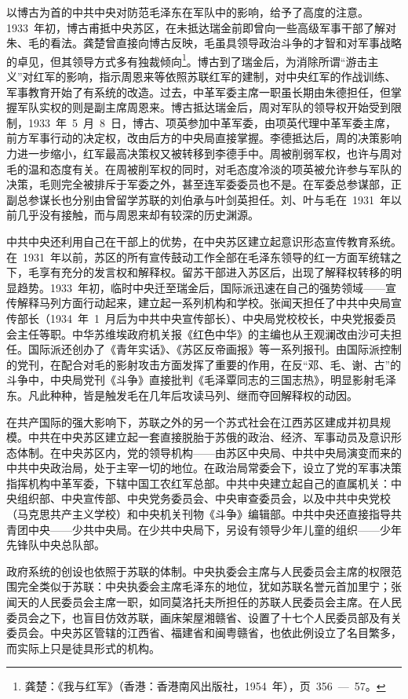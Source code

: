 以博古为首的中共中央对防范毛泽东在军队中的影响，给予了高度的注意。1933~年初，博古甫抵中央苏区，在未抵达瑞金前即曾向一些高级军事干部了解对朱、毛的看法。龚楚曾直接向博古反映，毛虽具领导政治斗争的才智和对军事战略的卓见，但其领导方式多有独裁倾向\footnote{龚楚：《我与红军》（香港：香港南风出版社，1954~年），页~356~—~57。}。博古到了瑞金后，为消除所谓“游击主义”对红军的影响，指示周恩来等依照苏联红军的建制，对中央红军的作战训练、军事教育开始了有系统的改造。过去，中革军委主席一职虽长期由朱德担任，但掌握军队实权的则是副主席周恩来。博古抵达瑞金后，周对军队的领导权开始受到限制，1933~年~5~月~8~日，博古、项英参加中革军委，由项英代理中革军委主席，前方军事行动的决定权，改由后方的中央局直接掌握。李德抵达后，周的决策影响力进一步缩小，红军最高决策权又被转移到李德手中。周被削弱军权，也许与周对毛的温和态度有关。在周被削军权的同时，对毛态度冷淡的项英被允许参与军队的决策，毛则完全被排斥于军委之外，甚至连军委委员也不是。在军委总参谋部，正副总参谋长也分别由曾留学苏联的刘伯承与叶剑英担任。刘、叶与毛在~1931~年以前几乎没有接触，而与周恩来却有较深的历史渊源。

中共中央还利用自己在干部上的优势，在中央苏区建立起意识形态宣传教育系统。在~1931~年以前，苏区的所有宣传鼓动工作全部在毛泽东领导的红一方面军统辖之下，毛享有充分的发言权和解释权。留苏干部进入苏区后，出现了解释权转移的明显趋势。1933~年初，临时中央迁至瑞金后，国际派迅速在自己的强势领域——宣传解释马列方面行动起来，建立起一系列机构和学校。张闻天担任了中共中央局宣传部长（1934~年~1~月后为中共中央宣传部长）、中央局党校校长，中央党报委员会主任等职。中华苏维埃政府机关报《红色中华》的主编也从王观澜改由沙可夫担任。国际派还创办了《青年实话》、《苏区反帝画报》等一系列报刊。由国际派控制的党刊，在配合对毛的影射攻击方面发挥了重要的作用，在反“邓、毛、谢、古”的斗争中，中央局党刊《斗争》直接批判《毛泽覃同志的三国志热》，明显影射毛泽东。凡此种种，皆是触发毛在几年后攻读马列、继而夺回解释权的动因。

在共产国际的强大影响下，苏联之外的另一个苏式社会在江西苏区建成并初具规模。中共在中央苏区建立起一套直接脱胎于苏俄的政治、经济、军事动员及意识形态体制。在中央苏区内，党的领导机构——由苏区中央局、中共中央局演变而来的中共中央政治局，处于主宰一切的地位。在政治局常委会下，设立了党的军事决策指挥机构中革军委，下辖中国工农红军总部。中共中央建立起自己的直属机关：中央组织部、中央宣传部、中央党务委员会、中央审查委员会，以及中共中央党校（马克思共产主义学校）和中央机关刊物《斗争》编辑部。中共中央还直接指导共青团中央——少共中央局。在少共中央局下，另设有领导少年儿童的组织——少年先锋队中央总队部。

政府系统的创设也依照于苏联的体制。中央执委会主席与人民委员会主席的权限范围完全类似于苏联：中央执委会主席毛泽东的地位，犹如苏联名誉元首加里宁；张闻天的人民委员会主席一职，如同莫洛托夫所担任的苏联人民委员会主席。在人民委员会之下，也盲目仿效苏联，画床架屋湘赣省、设置了十七个人民委员部及有关委员会。中央苏区管辖的江西省、福建省和闽粤赣省，也依此例设立了名目繁多，而实际上只是徒具形式的机构。

